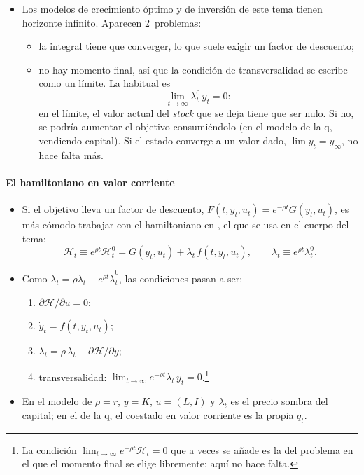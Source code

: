 \documentclass[11pt]{article}
\begin{document}
\begin{itemize}
\item Los modelos de crecimiento óptimo  y de inversión de este tema tienen horizonte infinito. Aparecen 2~problemas:
  \begin{itemize}
  \item la integral tiene que converger, lo que suele exigir un factor de descuento;
  \item no hay momento final, así que la condición de transversalidad se escribe como un límite. La habitual es
    \begin{equation*}
    \lim_{t\to\infty}\lambda^0_t\,y_t=0:
    \end{equation*}
    en el límite, el valor actual del \emph{stock} que se deja tiene que ser nulo. Si no, se podría aumentar el objetivo consumiéndolo (en el modelo de la q, vendiendo capital). Si el estado converge a un valor dado, $\lim y_t=y_{\infty}$, no hace falta más.
  \end{itemize}
\end{itemize}

\paragraph{El hamiltoniano en valor corriente}

\begin{itemize}
\item Si el objetivo lleva un factor de descuento, $F(t,y_t,u_t)=e^{-\rho t}G(y_t,u_t)$, es más cómodo trabajar con el hamiltoniano en , el que se usa en el cuerpo del tema:
  \begin{equation*}
  \mathcal{H}_t\equiv e^{\rho t}\mathcal{H}^0_t=G(y_t,u_t)+\lambda_t\,f(t,y_t,u_t),\qquad \lambda_t\equiv e^{\rho t}\lambda^0_t.
  \end{equation*}
\item Como $\dot\lambda_t=\rho\lambda_t+e^{\rho t}\dot\lambda^0_t$, las condiciones pasan a ser:
  \begin{enumerate}
  \item $\partial\mathcal{H}/\partial u=0$;
  \item $\dot y_t=f(t,y_t,u_t)$;
  \item $\dot\lambda_t=\rho\,\lambda_t-\partial\mathcal{H}/\partial y$;
  \item transversalidad: $\lim_{t\to\infty}e^{-\rho t}\lambda_t\,y_t=0$.\footnote{La condición $\lim_{t\to\infty}e^{-\rho t}\mathcal{H}_t=0$ que a veces se añade es la del problema en el que el momento final se elige libremente; aquí no hace falta.}
  \end{enumerate}
\item En el modelo de  $\rho=r$, $y=K$, $u=(L,I)$ y $\lambda_t$ es el precio sombra del capital; en el de la q, el coestado en valor corriente es la propia $q_t$.
\end{itemize}
\end{document}
